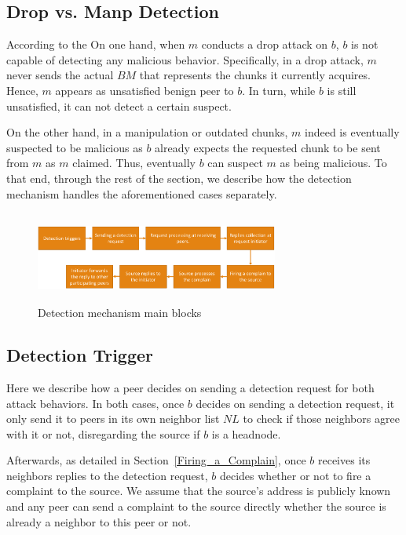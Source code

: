 \subsection{Drop vs. Manp Detection}
According to the 
On one hand, when $m$ conducts a drop attack on $b$, $b$ is not capable of detecting any malicious behavior.
Specifically, in a drop attack, $m$ never sends the actual $BM$ that represents the chunks it currently acquires.
Hence, $m$ appears as unsatisfied benign peer to $b$.
In turn, while $b$ is still unsatisfied, it can not detect a certain suspect. 

On the other hand, in a manipulation or outdated chunks, $m$ indeed is eventually suspected to be malicious as $b$ already expects the requested chunk to be sent from $m$ as $m$ claimed.
Thus, eventually $b$ can suspect $m$ as being malicious.
To that end, through the rest of the section, we describe how the detection mechanism handles the aforementioned cases separately.

\begin{figure}
 \centering
 \includegraphics[width=8cm,height=3cm]{./Figures/detection-blocks.eps}
  \caption{Detection mechanism main blocks}
\label{detection-blocks} 
\end{figure}

\subsection{Detection Trigger}
Here we describe how a peer decides on sending a detection request for both attack behaviors.
In both cases, once $b$ decides on sending a detection request, it only send it to peers in its own neighbor list $NL$ to check if those neighbors agree with it or not, disregarding the source if $b$ is a headnode.

Afterwards, as detailed in Section~\ref{Firing_a_Complain}, once $b$ receives its neighbors replies to the detection request, $b$ decides whether or not to fire a complaint to the source.
We assume that the source's address is publicly known and any peer can send a complaint to the source directly whether the source is already a neighbor to this peer or not.

